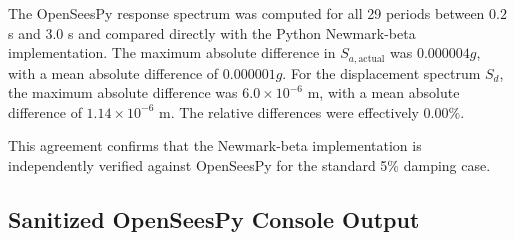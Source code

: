 ﻿\documentclass[12pt]{article}
\begin{document}
The OpenSeesPy response spectrum was computed for all 29 periods between $0.2$ s and $3.0$ s and compared directly with the Python Newmark-beta implementation. The maximum absolute difference in $S_{a,\mathrm{actual}}$ was $0.000004g$, with a mean absolute difference of $0.000001g$. For the displacement spectrum $S_d$, the maximum absolute difference was $6.0\times10^{-6}$ m, with a mean absolute difference of $1.14\times10^{-6}$ m. The relative differences were effectively $0.00\%$.

This agreement confirms that the Newmark-beta implementation is independently verified against OpenSeesPy for the standard 5\% damping case.

\subsection{Sanitized OpenSeesPy Console Output}
\end{document}
